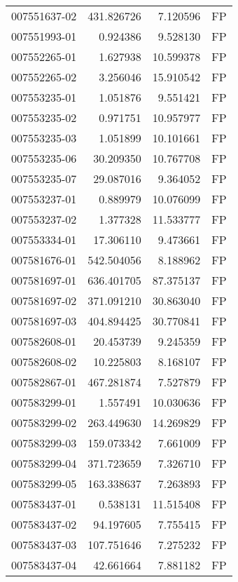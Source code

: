 \begin{tabular}{lrrl}
007551637-02 &  431.826726 &       7.120596 &   FP \\
007551993-01 &    0.924386 &       9.528130 &   FP \\
007552265-01 &    1.627938 &      10.599378 &   FP \\
007552265-02 &    3.256046 &      15.910542 &   FP \\
007553235-01 &    1.051876 &       9.551421 &   FP \\
007553235-02 &    0.971751 &      10.957977 &   FP \\
007553235-03 &    1.051899 &      10.101661 &   FP \\
007553235-06 &   30.209350 &      10.767708 &   FP \\
007553235-07 &   29.087016 &       9.364052 &   FP \\
007553237-01 &    0.889979 &      10.076099 &   FP \\
007553237-02 &    1.377328 &      11.533777 &   FP \\
007553334-01 &   17.306110 &       9.473661 &   FP \\
007581676-01 &  542.504056 &       8.188962 &   FP \\
007581697-01 &  636.401705 &      87.375137 &   FP \\
007581697-02 &  371.091210 &      30.863040 &   FP \\
007581697-03 &  404.894425 &      30.770841 &   FP \\
007582608-01 &   20.453739 &       9.245359 &   FP \\
007582608-02 &   10.225803 &       8.168107 &   FP \\
007582867-01 &  467.281874 &       7.527879 &   FP \\
007583299-01 &    1.557491 &      10.030636 &   FP \\
007583299-02 &  263.449630 &      14.269829 &   FP \\
007583299-03 &  159.073342 &       7.661009 &   FP \\
007583299-04 &  371.723659 &       7.326710 &   FP \\
007583299-05 &  163.338637 &       7.263893 &   FP \\
007583437-01 &    0.538131 &      11.515408 &   FP \\
007583437-02 &   94.197605 &       7.755415 &   FP \\
007583437-03 &  107.751646 &       7.275232 &   FP \\
007583437-04 &   42.661664 &       7.881182 &   FP \\

\end{tabular}
